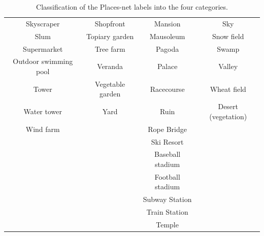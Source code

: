 \documentclass{paper}
\begin{document}
\begin{table}[htb!]
\begin{tabular}{ |c|c|c|c| }
        Skyscraper & Shopfront & Mansion & Sky \\
        Slum & Topiary garden & Mausoleum & Snow field \\
        Supermarket & Tree farm & Pagoda & Swamp \\
        Outdoor swimming pool & Veranda & Palace & Valley \\
        Tower & Vegetable garden  & Racecourse & Wheat field \\
        Water tower & Yard & Ruin & Desert (vegetation) \\
        Wind farm &  & Rope Bridge & \\
        &  & Ski Resort & \\
        &  & Baseball stadium & \\
        &  & Football stadium & \\
        &  & Subway Station & \\
        &  & Train Station & \\
        &  & Temple & \\
        \hline
    \end{tabular}
    \caption{Classification of the Places-net labels into the four categories.}
		\label{tab:PlacesLabels}
\end{table}



\end{document}
